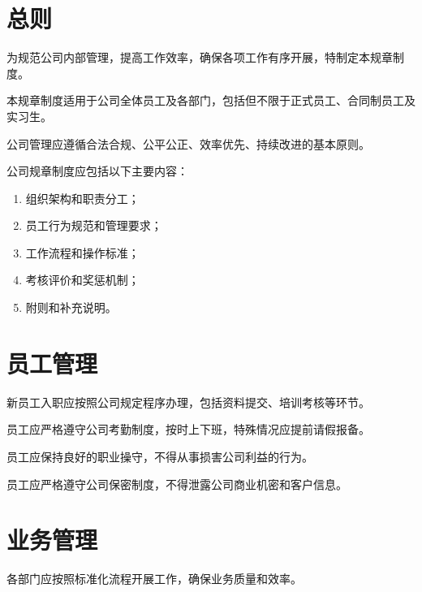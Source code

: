 \documentclass[UTF8]{ctexart}
\author{} %
\date{}   %
\begin{document}

\maketitle

\section{总则}

为规范公司内部管理，提高工作效率，确保各项工作有序开展，特制定本规章制度。

本规章制度适用于公司全体员工及各部门，包括但不限于正式员工、合同制员工及实习生。

公司管理应遵循合法合规、公平公正、效率优先、持续改进的基本原则。

公司规章制度应包括以下主要内容：
\begin{enumerate}
    \item 组织架构和职责分工；
    \item 员工行为规范和管理要求；
    \item 工作流程和操作标准；
    \item 考核评价和奖惩机制；
    \item 附则和补充说明。
\end{enumerate}

\section{员工管理}

新员工入职应按照公司规定程序办理，包括资料提交、培训考核等环节。

员工应严格遵守公司考勤制度，按时上下班，特殊情况应提前请假报备。

员工应保持良好的职业操守，不得从事损害公司利益的行为。

员工应严格遵守公司保密制度，不得泄露公司商业机密和客户信息。

\section{业务管理}

各部门应按照标准化流程开展工作，确保业务质量和效率。
\end{document}
